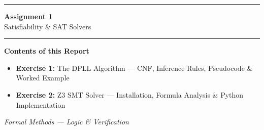 \documentclass[11pt, a4paper]{article}
\begin{document}

\begin{titlepage}
\centering
\vspace*{3cm}

{\color{primaryblue}\rule{\linewidth}{2.5pt}}
\vspace{0.6em}

{\Huge\bfseries\color{primaryblue} Assignment 1}\\[0.4em]
{\Large\color{accentblue} Satisfiability \& SAT Solvers}

\vspace{0.5em}
{\color{primaryblue}\rule{\linewidth}{2.5pt}}

\vspace{1.5cm}

\begin{tcolorbox}[keystyle, width=0.82\linewidth]
\centering
\textbf{Contents of this Report}\\[0.5em]
\begin{itemize}
\item \textbf{Exercise 1:} The DPLL Algorithm — CNF, Inference Rules, Pseudocode \& Worked Example\\[0.4em]
\item \textbf{Exercise 2:} Z3 SMT Solver — Installation, Formula Analysis \& Python Implementation
\end{itemize}
\end{tcolorbox}

\vspace{2cm}


\vfill

{\small\color{captioncolor}\itshape Formal Methods — Logic \& Verification}

\end{titlepage}

\tableofcontents
\newpage
\end{document}
